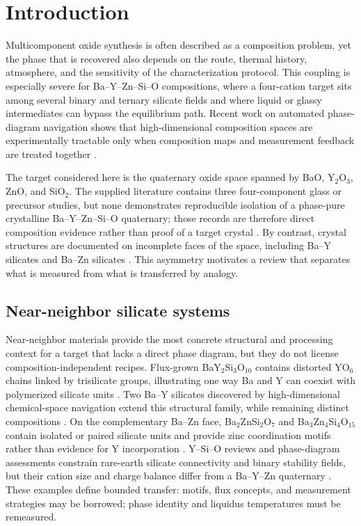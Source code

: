 \section{Introduction}

Multicomponent oxide synthesis is often described as a composition problem, yet the phase that is recovered also depends on the route, thermal history, atmosphere, and the sensitivity of the characterization protocol. This coupling is especially severe for Ba--Y--Zn--Si--O compositions, where a four-cation target sits among several binary and ternary silicate fields and where liquid or glassy intermediates can bypass the equilibrium path. Recent work on automated phase-diagram navigation shows that high-dimensional composition spaces are experimentally tractable only when composition maps and measurement feedback are treated together \cite{chen2024navigating,yang2021discovery,choi2026ai}.

The target considered here is the quaternary oxide space spanned by BaO, Y$_2$O$_3$, ZnO, and SiO$_2$. The supplied literature contains three four-component glass or precursor studies, but none demonstrates reproducible isolation of a phase-pure crystalline Ba--Y--Zn--Si--O quaternary; those records are therefore direct composition evidence rather than proof of a target crystal \cite{kozhevnikova2024synthesis,kaur2011influence,sayyed2026physical}. By contrast, crystal structures are documented on incomplete faces of the space, including Ba--Y silicates and Ba--Zn silicates \cite{kolitsch2006bay2si3o10,hulai2024navigation,kaiser2002crystal,ababaikeri2024ba}. This asymmetry motivates a review that separates what is measured from what is transferred by analogy.

\subsection{Near-neighbor silicate systems}

Near-neighbor materials provide the most concrete structural and processing context for a target that lacks a direct phase diagram, but they do not license composition-independent recipes. Flux-grown BaY$_2$Si$_3$O$_{10}$ contains distorted YO$_6$ chains linked by trisilicate groups, illustrating one way Ba and Y can coexist with polymerized silicate units \cite{kolitsch2006bay2si3o10}. Two Ba--Y silicates discovered by high-dimensional chemical-space navigation extend this structural family, while remaining distinct compositions \cite{hulai2024navigation}. On the complementary Ba--Zn face, Ba$_2$ZnSi$_2$O$_7$ and Ba$_3$Zn$_4$Si$_4$O$_{15}$ contain isolated or paired silicate units and provide zinc coordination motifs rather than evidence for Y incorporation \cite{kaiser2002crystal,ababaikeri2024ba}. Y--Si--O reviews and phase-diagram assessments constrain rare-earth silicate connectivity and binary stability fields, but their cation size and charge balance differ from a Ba--Y--Zn quaternary \cite{sun2014recent,zhi2022thermodynamic,qi2024thermodynamic}. These examples define bounded transfer: motifs, flux concepts, and measurement strategies may be borrowed; phase identity and liquidus temperatures must be remeasured.

